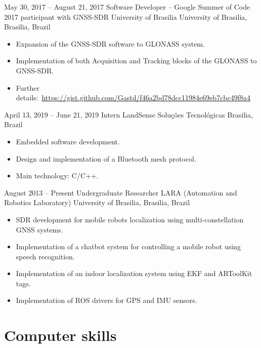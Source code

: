 \documentclass[a4paper, 10pt]{moderncv}        %
\begin{document}
\cventry
{May 30, 2017 -- August 21, 2017}
{Software Developer -- Google Summer of Code 2017 participant with GNSS-SDR}
{University of Brasilia}
{University of Brasilia, Brasilia, Brazil}
{}
{\begin{itemize}%
    \item Expansion of the GNSS-SDR software to GLONASS system.
    \item Implementation of both Acquisition and Tracking blocks of the GLONASS to GNSS-SDR.
    \item Further details:~\url{https://gist.github.com/Gastd/f46a2bd78dcc11984e69eb7cbc49f8a4}
    \end{itemize}}
\cventry
{April 13, 2019 -- June 21, 2019}
{Intern}
{LandSense Soluções Tecnológicas}
{Brasilia, Brazil}
{}
{\begin{itemize}%
    \item Embedded software development.
    \item Design and implementation of a Bluetooth mesh protocol.
    \item Main technology: C/C++.
    \end{itemize}}
\cventry
{August 2013 -- Present}
{Undergraduate Researcher}
{LARA (Automation and Robotics Laboratory)}
{University of Brasilia, Brasilia, Brazil}
{}
{\begin{itemize}%
    \item SDR development for mobile robots localization using multi-constellation GNSS systems.
    \item Implementation of a \textquotedbl{}chatbot\textquotedbl{} system for controlling a mobile robot using speech recognition.
    \item Implementation of an indoor localization system using EKF and ARToolKit tags.
    \item Implementation of ROS drivers for GPS and IMU sensors.
    \end{itemize}}

\section{Computer skills}
\end{document}
